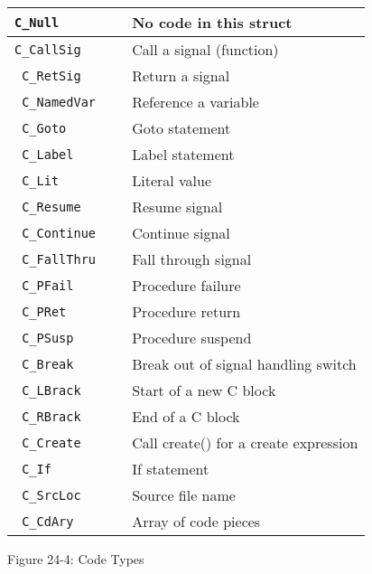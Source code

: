 \begin{center}
\tabletail{}
\tablelasttail{}
\begin{xtabular}{|>{\texttt\bgroup}m{1in}<{\egroup}|m{0.5in}|m{2.5in}|}
\hline
C\_Null &
 &
 No code in this struct\\\hline
C\_CallSig &
 &
 Call a signal (function)\\\hline
 C\_RetSig &
 &
 Return a signal\\\hline
 C\_NamedVar &
 &
 Reference a variable\\\hline
 C\_Goto &
 &
 Goto statement\\\hline
 C\_Label &
 &
 Label statement\\\hline
 C\_Lit &
 &
 Literal value\\\hline
 C\_Resume &
 &
 Resume signal\\\hline
 C\_Continue &
 &
 Continue signal\\\hline
 C\_FallThru &
 &
 Fall through signal\\\hline
 C\_PFail &
 &
 Procedure failure\\\hline
 C\_PRet &
 &
 Procedure return\\\hline
 C\_PSusp &
 &
 Procedure suspend\\\hline
 C\_Break &
 &
 Break out of signal handling switch\\\hline
 C\_LBrack &
 &
 Start of a new C block\\\hline
 C\_RBrack &
 &
 End of a C block\\\hline
 C\_Create &
 &
 Call create() for a create expression\\\hline
 C\_If &
 &
 If statement\\\hline
 C\_SrcLoc &
 &
 Source file name\\\hline
 C\_CdAry &
 &
 Array of code pieces\\\hline
\end{xtabular}
\end{center}
{\centering{}
Figure 24-4: Code Types
\par}


